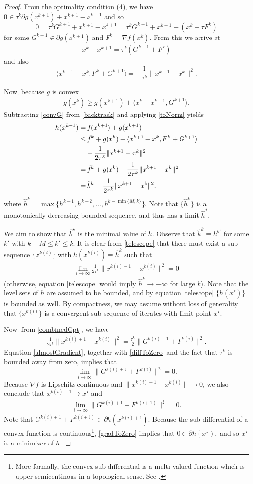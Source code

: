 \documentclass{amsart}
\newcommand{\eqn}[2]{\begin{equation}\label{#1}#2\end{equation}}
\newcommand{\aln}[1]{\begin{align}#1\end{align}}
\newcommand{\ra}{\rangle}
\newcommand{\la}{\langle}
\newcommand{\kp}{^{k+1}}
\newcommand{\opt}{^\star}
\theoremstyle{definition}
\begin{document}
\begin{proof}

  From the optimality condition (4), we have $0 \in \tau^k  \partial  g(x\kp) + x\kp-\bar x\kp $ and so
  $$0 = \tau^k G\kp +x\kp- \bar x\kp = \tau^k G\kp + x\kp-(x^k-\tau F^k) $$
  for some $G\kp \in \partial g(x\kp)$ and $F^k = \nabla f(x^k).$  From this we arrive at
  \aln{ \label{combinedOpt}
  x^k-x\kp = \tau^k (G\kp+F^k)
  }  
  and also
  \eqn{toNorm}{
   \la x\kp-x^k, F^k+G\kp \ra = - \frac{1}{\tau^k}\|x\kp-x^k\|^2.
   }
  
  Now, because $g$ is convex
  \aln{\label{convG}
    g(x^k) \ge g(x\kp)+\la x^k-x\kp, G\kp  \ra.
  }
  Subtracting \eqref{convG} from \eqref{backtrack} and applying \eqref{toNorm} yields
\aln{ \label{telescope} 
 h(x\kp) =& \, f(x\kp)+g(x\kp)  \notag
 \\ \le & \, \hat f^k+ g(x^k) + \la x\kp-x^k, F^k+G\kp \ra \notag \\ 
                  & +\frac{1}{2\tau^k}\|x\kp-x^k\|^2 \notag \\
     = & \,  \hat f^k+ g(x^k)-\frac{1}{2\tau^k}\|x\kp-x^k\|^2\notag \\
      = &  \, \hat h^k-\frac{1}{2\tau^k}\|x\kp-x^k\|^2 .
  }
  where $\hat h^k =  \max \{ h^{k-1},h^{k-2},\dots,h^{k- \min\{M,k\} }  \} .$  Note that $\{\hat h^k\}$ is a monotonically decreasing bounded sequence, and thus has a limit $\hat h^*.$  
  
  We aim to show that  $\hat h\opt$ is the minimal value of  $h$.   Observe that $\hat h^k = h^{k'}$ for some $k'$ with  $k-M\le k' \le k.$   It is clear from \eqref{telescope} that there must exist a sub-sequence  $\{ x^{k(i)} \}$ with $h(x^{k(i)} ) = \hat h^k$ such that 
  \aln{ \label{diffToZero}
  \lim_{i\to\infty} \frac{1}{2\tau^k}\|x^{k(i)+1} -x^{k(i)} \|^2=0
  }
   (otherwise, equation \eqref{telescope} would imply $\hat h^k\to -\infty$ for large $k$).  Note that  the level sets of $h$ are assumed to be bounded, and by equation \eqref{telescope} $\{h(x^k)\}$ is bounded as well.  By compactness,  we may assume without loss of generality that $\{ x^{k(i)} \}$ is a convergent sub-sequence of iterates with limit point $x\opt$.  
   
   Now, from  \eqref{combinedOpt}, we have 
   \aln{ \label{almostGradient}
    \frac{1}{2\tau^k} \|x^{k(i)+1} -x^{k(i)} \|^2 = \frac{\tau^k}{2} \| G^{k(i)+1} +F^{k(i)} \|^2 .
    }
   Equation \eqref{almostGradient}, together with  \eqref{diffToZero} and the fact that $\tau^k$ is bounded away from zero, implies that
     $$\lim_{i\to\infty} \| G^{k(i)+1} +F^{k(i)} \|^2 =0.$$   Because $\nabla f$ is Lipschitz continuous and $\|x^{k(i)+1} -x^{k(i)} \|\to0$, we also conclude that  $ x^{k(i)+1} \to x\opt$ and
        \aln{ \label{gradToZero}
        \lim_{i\to\infty} \| G^{k(i)+1} +F^{k(i+1)} \|^2 =0. 
        }
  Note that $G^{k(i)+1} +F^{k(i+1)} \in \partial h(x^{k(i)+1})$.   Because the sub-differential of a convex function is continuous\footnote{More formally, the convex  sub-differential is a multi-valued function which is upper semicontinous in a topological sense. See \cite{CSZ07,BC11}.  },  \eqref{gradToZero} implies that $0 \in \partial h(x\opt),$ and so  $x\opt$ is a minimizer of $h$.
  

\end{proof}
\end{document}
